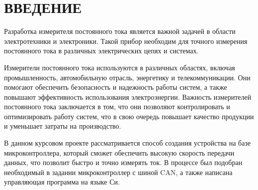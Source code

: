 \begin{sloppypar} %
\newpage %
\section*{ВВЕДЕНИЕ} %

Разработка измерителя постоянного тока является важной задачей в области электротехники и электроники. Такой прибор необходим для точного измерения постоянного тока в различных электрических цепях и системах.

Измерители постоянного тока используются в различных областях, включая промышленность, автомобильную отрасль, энергетику и телекоммуникации. Они помогают обеспечить безопасность и надежность работы систем, а также повышают эффективность использования электроэнергии. Важность измерителей постоянного тока заключается в том, что они позволяют контролировать и оптимизировать работу систем, что в свою очередь повышает качество продукции и уменьшает затраты на производство.

В данном курсовом проекте рассматривается способ создания устройства на базе микроконтроллера, который сможет обеспечить высокую скорость передачи данных, что позволит быстро и точно измерять ток. В процессе был подобран необходимый в задании микроконтроллер с шиной CAN, а также написана управляющая программа на языке Си. 


\end{sloppypar}
